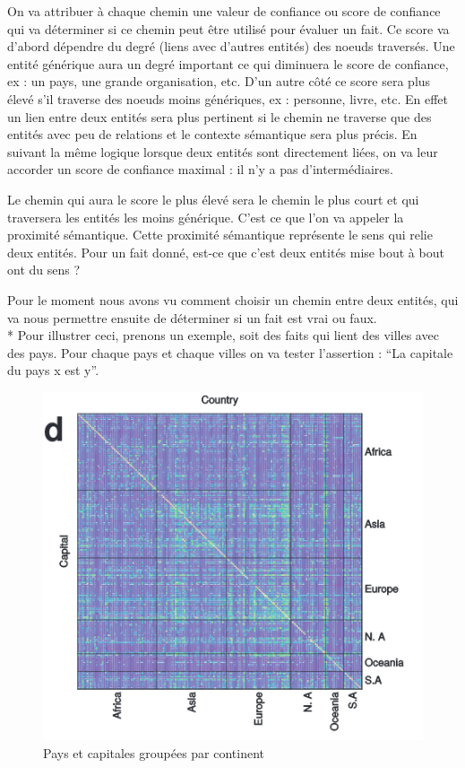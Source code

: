 On va attribuer à chaque chemin une valeur de confiance ou score de confiance qui va déterminer si ce chemin peut être utilisé pour évaluer un fait. Ce score va d'abord dépendre du degré (liens avec d'autres entités) des noeuds traversés. Une entité générique aura un degré important ce qui diminuera le score de confiance, ex : un pays, une grande organisation, etc. D'un autre côté ce score sera plus élevé s'il traverse des noeuds moins génériques, ex : personne, livre, etc. En effet un lien entre deux entités sera plus pertinent si le chemin ne traverse que des entités avec peu de relations et le contexte sémantique sera plus précis. En suivant la même logique lorsque deux entités sont directement liées, on va leur accorder un score de confiance maximal : il n'y a pas d'intermédiaires.

Le chemin qui aura le score le plus élevé sera le chemin le plus court et qui traversera les entités les moins générique. C'est ce que l'on va appeler la proximité sémantique. Cette proximité sémantique représente le sens qui relie deux entités. Pour un fait donné, est-ce que c'est deux entités mise bout à bout ont du sens ? 

Pour le moment nous avons vu comment choisir un chemin entre deux entités, qui va nous permettre ensuite de déterminer si un fait est vrai ou faux. 
\\*
Pour illustrer ceci, prenons un exemple, soit des faits qui lient des villes avec des pays. Pour chaque pays et chaque villes on va tester l'assertion : \enquote{La capitale du pays x est y}.

\begin{figure}[h]
\centering
\includegraphics[draft=false, scale=0.5]{imgs/country_cap_check.PNG}
\caption{Pays et capitales groupées par continent}
\label{fig1}
\end{figure}

